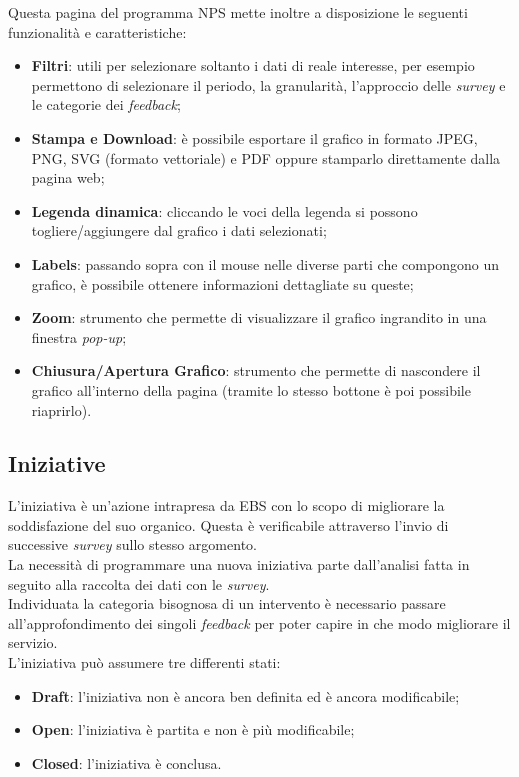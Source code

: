 Questa pagina del programma NPS mette inoltre a disposizione le seguenti funzionalità e caratteristiche: 
\begin{itemize}
\item \textbf{Filtri}: utili per selezionare soltanto i dati di reale interesse, per esempio permettono di selezionare il periodo, la granularità, l'approccio delle \textit{survey} e le categorie dei \textit{feedback};
\item \textbf{Stampa e Download}: è possibile esportare il grafico in formato JPEG, PNG, SVG (formato vettoriale) e PDF oppure stamparlo direttamente dalla pagina web;
\item \textbf{Legenda dinamica}: cliccando le voci della legenda si possono togliere/aggiungere dal grafico i dati selezionati;
\item \textbf{Labels}: passando sopra con il mouse nelle diverse parti che compongono un grafico, è possibile ottenere informazioni dettagliate su queste;
\item \textbf{Zoom}: strumento che permette di visualizzare il grafico ingrandito in una finestra \textit{pop-up};
\item \textbf{Chiusura/Apertura Grafico}: strumento che permette di nascondere il grafico all'interno della pagina (tramite lo stesso bottone è poi possibile riaprirlo).
\end{itemize}

\subsection{Iniziative}
L'iniziativa è un'azione intrapresa da EBS con lo scopo di migliorare la soddisfazione del suo organico. Questa è verificabile attraverso l'invio di successive \textit{survey} sullo stesso argomento.\\
La necessità di programmare una nuova iniziativa parte dall'analisi fatta in seguito
alla raccolta dei dati con le \textit{survey}.\\
Individuata la categoria bisognosa di un intervento è necessario passare
all'approfondimento dei singoli \textit{feedback} per poter capire in che modo migliorare il servizio.\\
L'iniziativa può assumere tre differenti stati:
\begin{itemize}
\item \textbf{Draft}: l'iniziativa non è ancora ben definita ed è ancora modificabile;
\item \textbf{Open}: l'iniziativa è partita e non è più modificabile;
\item \textbf{Closed}: l'iniziativa è conclusa.
\end{itemize}

